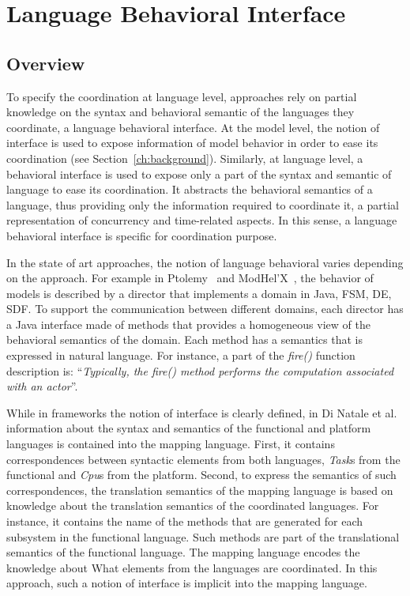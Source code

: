 \section{Language Behavioral Interface}
\subsection{Overview}
To specify the coordination at language level, approaches rely on partial knowledge on the syntax and behavioral semantic of the languages they coordinate, \ie a language behavioral interface. At the model level, the notion of interface is used to expose information of model behavior in order to ease its coordination (see Section~\ref{ch:background}). Similarly, at language level, a behavioral interface is used to expose only a part of the syntax and semantic of language to ease its coordination. It abstracts the behavioral semantics of a language, thus providing only the information required to coordinate it, \ie a partial representation of concurrency and time-related aspects. In this sense, a language behavioral interface is specific for coordination purpose.    

In the state of art approaches, the notion of language behavioral varies depending on the approach. For example in Ptolemy~\cite{ptoleframebib} and ModHel'X~\cite{modhelxbib}, the behavior of models is described by a director that implements a domain in Java, \eg FSM, DE, SDF. To support the communication between different domains, each director has a Java interface made of methods that provides a homogeneous view of the behavioral semantics of the domain. Each method has a semantics that is expressed in natural language. For instance, a part of the \emph{fire()} function description is: ``\emph{Typically, the fire() method performs the computation associated with an actor}''.
 	
While in frameworks the notion of interface is clearly defined, in Di Natale et al.~\cite{dinatale} information about the syntax and semantics of the functional and platform languages is contained into the mapping language. First, it contains correspondences between syntactic elements from both languages, \eg \emph{Task}s from the functional and \emph{Cpu}s from the platform. Second, to express the semantics of such correspondences, the translation semantics of the mapping language is based on knowledge about the translation semantics of the coordinated languages. For instance, it contains the name of the methods that are generated for each subsystem in the functional language. Such methods are part of the translational semantics of the functional language. The mapping language encodes the knowledge about What elements from the languages are coordinated. In this approach, such a notion of interface is implicit into the mapping language. 

